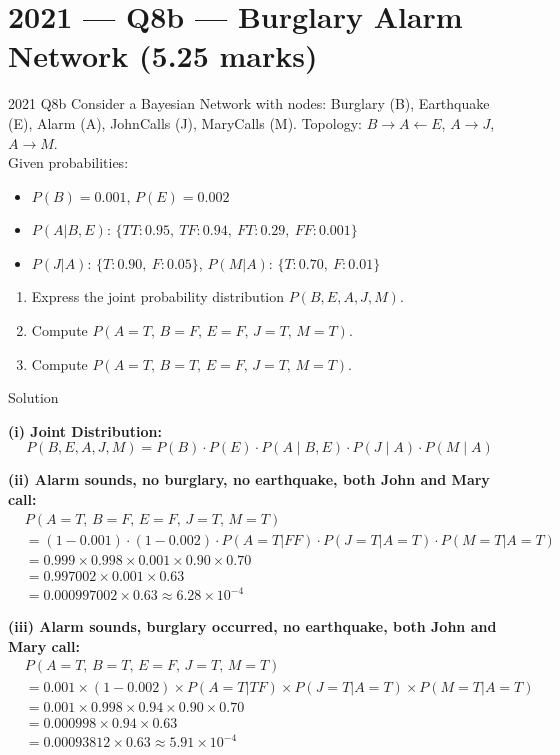 \documentclass[12pt,a4paper]{article}
\begin{document}
\newpage
\section{2021 --- Q8b --- Burglary Alarm Network (5.25 marks)}

\begin{qbox}{2021 Q8b}
Consider a Bayesian Network with nodes: Burglary (B), Earthquake (E), Alarm (A), JohnCalls (J), MaryCalls (M). Topology: $B \to A \leftarrow E$, $A \to J$, $A \to M$.\\[4pt]
Given probabilities:
\begin{itemize}[noitemsep]
  \item $P(B)=0.001$, \quad $P(E)=0.002$
  \item $P(A|B,E)$: $\{TT: 0.95,\ TF: 0.94,\ FT: 0.29,\ FF: 0.001\}$
  \item $P(J|A)$: $\{T: 0.90,\ F: 0.05\}$, \quad $P(M|A)$: $\{T: 0.70,\ F: 0.01\}$
\end{itemize}
\begin{enumerate}[label=(\roman*)]
  \item Express the joint probability distribution $P(B,E,A,J,M)$.
  \item Compute $P(A=T,\, B=F,\, E=F,\, J=T,\, M=T)$.
  \item Compute $P(A=T,\, B=T,\, E=F,\, J=T,\, M=T)$.
\end{enumerate}
\end{qbox}

\begin{solbox}{Solution}

\textbf{(i) Joint Distribution:}
\[
P(B,E,A,J,M) = P(B)\cdot P(E)\cdot P(A \mid B,E)\cdot P(J \mid A)\cdot P(M \mid A)
\]

\textbf{(ii) Alarm sounds, no burglary, no earthquake, both John and Mary call:}
\begin{align*}
&P(A{=}T,\,B{=}F,\,E{=}F,\,J{=}T,\,M{=}T)\\
&= (1-0.001)\cdot(1-0.002)\cdot P(A{=}T|FF)\cdot P(J{=}T|A{=}T)\cdot P(M{=}T|A{=}T)\\
&= 0.999 \times 0.998 \times 0.001 \times 0.90 \times 0.70\\
&= 0.997002 \times 0.001 \times 0.63\\
&= 0.000997002 \times 0.63 \approx \boxed{6.28 \times 10^{-4}}
\end{align*}

\textbf{(iii) Alarm sounds, burglary occurred, no earthquake, both John and Mary call:}
\begin{align*}
&P(A{=}T,\,B{=}T,\,E{=}F,\,J{=}T,\,M{=}T)\\
&= 0.001 \times (1-0.002) \times P(A{=}T|TF) \times P(J{=}T|A{=}T) \times P(M{=}T|A{=}T)\\
&= 0.001 \times 0.998 \times 0.94 \times 0.90 \times 0.70\\
&= 0.000998 \times 0.94 \times 0.63\\
&= 0.00093812 \times 0.63 \approx \boxed{5.91 \times 10^{-4}}
\end{align*}
\end{solbox}
\end{document}
